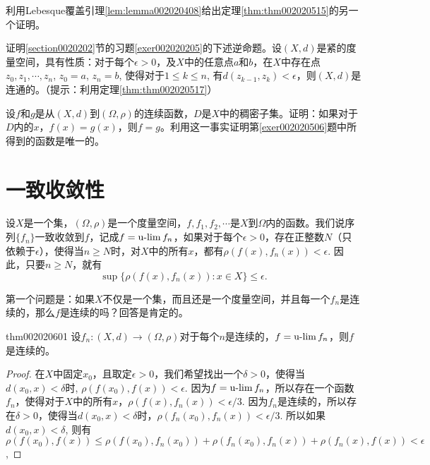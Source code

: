 \begin{exercise}
利用Lebesque覆盖引理\ref{lem:lemma002020408}给出定理\ref{thm:thm002020515}的另一个证明。
\end{exercise}

\begin{exercise}
证明\ref{section0020202}节的习题\ref{exer002020205}的下述逆命题。设$(X, d)$是紧的度量空间，具有性质：对于每个$\epsilon > 0$，及$X$中的任意点$a$和$b$，在$X$中存在点$z_0,z_1,\cdots, z_n$, $z_0 = a$, $z_n = b$, 使得对于$1 \le k \le n$, 有$d(z_{k-1}, z_k) < \epsilon$，则$(X, d)$是连通的。（提示：利用定理\ref{thm:thm002020517}）
\end{exercise}

\begin{exercise}
设$f$和$g$是从$(X, d)$到$(\Omega, \rho)$的连续函数，$D$是$X$中的稠密子集。证明：如果对于$D$内的$x$，$f(x)=g(x)$，则$f=g$。利用这一事实证明第\ref{exer002020506}题中所得到的函数是唯一的。
\end{exercise}


\section{一致收敛性}\label{section0020206}
设$X$是一个集，$(\Omega, \rho)$是一个度量空间，$f, f_1, f_2, \cdots$是$X$到$\Omega$内的函数。我们说序列$\{f_n\}$一致收敛到$f$，记成$f=\operatorname{u-lim}{f_n}$，如果对于每个$\epsilon > 0$，存在正整数$N$（只依赖于$\epsilon$），使得当$n \ge N$时，对$X$中的所有$x$，都有$\rho(f(x), f_n(x)) < \epsilon$. 因此，只要$n \ge N$，就有
\[
\sup\{\rho(f(x), f_n(x)) : x \in X\} \le \epsilon.
\]

第一个问题是：如果$X$不仅是一个集，而且还是一个度量空间，并且每一个$f_n$是连续的，那么$f$是连续的吗？回答是肯定的。
\begin{theorem}{}{thm002020601}
设$f_n:(X, d) \to (\Omega, \rho)$对于每个$n$是连续的，$f=\operatorname{u-lim}{f_n}$，则$f$是连续的。
\end{theorem}

\begin{proof}
在$X$中固定$x_0$，且取定$\epsilon > 0$，我们希望找出一个$\delta > 0$，使得当$d(x_0, x)< \delta$时, $\rho(f(x_0), f(x)) < \epsilon$. 因为$f = \operatorname{u-lim}{f_n}$，所以存在一个函数$f_n$，使得对于$X$中的所有$x$，$\rho(f(x), f_n(x)) < \epsilon/3$. 因为$f_n$是连续的，所以存在$\delta>0$，使得当$d(x_0, x)< \delta$时，$\rho(f_n(x_0), f_n(x)) < \epsilon/3$. 所以如果$d(x_0, x)<\delta$, 则有$\rho(f(x_0), f(x)) \le \rho(f(x_0), f_n(x_0)) + \rho(f_n(x_0), f_n(x)) + \rho(f_n(x), f(x)) < \epsilon$,
\end{proof}

